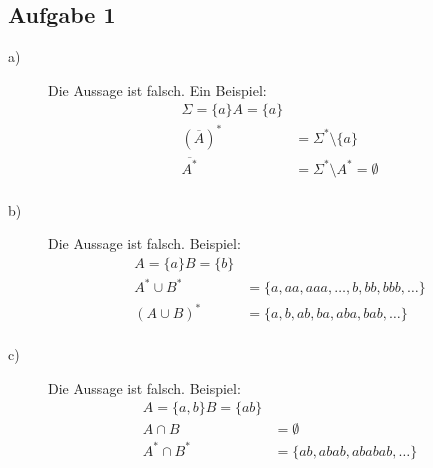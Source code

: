 \documentclass[a4paper]{scrartcl}
\begin{document}
\maketitle

\subsection{Aufgabe 1}
\begin{description}
  \item[a)]
    Die Aussage ist falsch. Ein Beispiel:
    \begin{align}
      \Sigma = \{a\} A = \{a\} \\
      (\overline{A})^* &=  \Sigma^* \setminus \{a\} \\
      \overline{A^*} &= \Sigma^* \setminus A^* = \emptyset \\
    \end{align}
  \item[b)] 
    Die Aussage ist falsch. Beispiel:
    \begin{align}
      A = \{a\} B = \{b\} \\
      A^* \cup B^* &= \{a,aa,aaa,\dots,b,bb,bbb,\dots\} \\
      (A \cup B)^* &= \{a,b,ab,ba,aba,bab,\dots\} \\
    \end{align}
  \item[c)]
    Die Aussage ist falsch. Beispiel:
    \begin{align}
      A = \{a,b\} B = \{ab\} \\
      A \cap B &= \emptyset \\
      A^* \cap B^* &= \{ab, abab, ababab, \dots\} \\
    \end{align}
\end{description}
\end{document}

